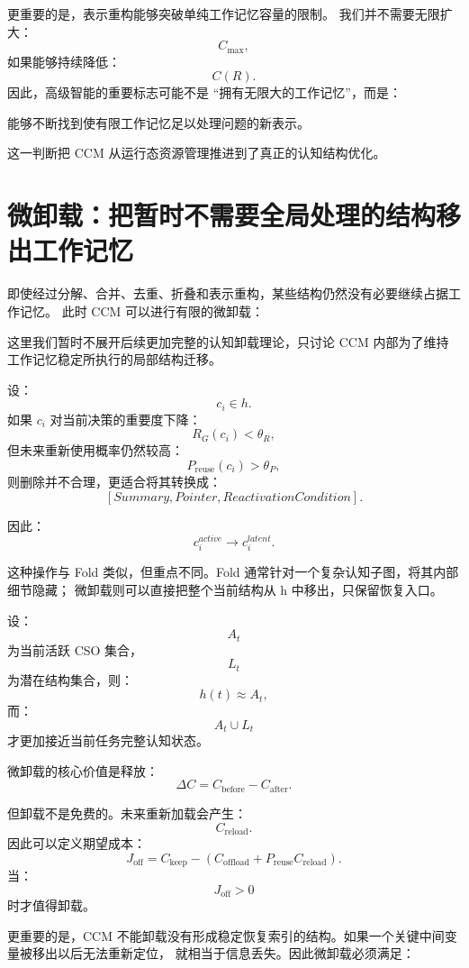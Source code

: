 更重要的是，表示重构能够突破单纯工作记忆容量的限制。
我们并不需要无限扩大：
\[
C_{\max},
\]
如果能够持续降低：
\[
C(R).
\]
因此，高级智能的重要标志可能不是 ``拥有无限大的工作记忆''，而是：
\begin{statementbox}
能够不断找到使有限工作记忆足以处理问题的新表示。
\end{statementbox}

这一判断把 CCM 从运行态资源管理推进到了真正的认知结构优化。


\section{微卸载：把暂时不需要全局处理的结构移出工作记忆}

即使经过分解、合并、去重、折叠和表示重构，某些结构仍然没有必要继续占据工作记忆。
此时 CCM 可以进行有限的微卸载：
\begin{statementbox}
\centering
{}
\end{statementbox}

这里我们暂时不展开后续更加完整的认知卸载理论，只讨论 CCM 内部为了维持工作记忆稳定所执行的局部结构迁移。

设：
\[
c_i\in h.
\]
如果 $c_i$ 对当前决策的重要度下降：
\[
R_G(c_i)<\theta_R,
\]
但未来重新使用概率仍然较高：
\[
P_{\mathrm{reuse}}(c_i)>\theta_P,
\]
则删除并不合理，更适合将其转换成：
\[
[
Summary,
Pointer,
ReactivationCondition
].
\]

因此：
\[
c_i^{active}
\longrightarrow
c_i^{latent}.
\]

这种操作与 Fold 类似，但重点不同。Fold 通常针对一个复杂认知子图，将其内部细节隐藏；
微卸载则可以直接把整个当前结构从 h 中移出，只保留恢复入口。

设：
\[
A_t
\]
为当前活跃 CSO 集合，
\[
L_t
\]
为潜在结构集合，则：
\[
h(t)\approx A_t,
\]
而：
\[
A_t\cup L_t
\]
才更加接近当前任务完整认知状态。

微卸载的核心价值是释放：
\[
\Delta C
=
C_{\mathrm{before}}
-
C_{\mathrm{after}}.
\]

但卸载不是免费的。未来重新加载会产生：
\[
C_{\mathrm{reload}}.
\]
因此可以定义期望成本：
\[
J_{\mathrm{off}}
=
C_{\mathrm{keep}}
-
\left(
C_{\mathrm{offload}}
+
P_{\mathrm{reuse}}
C_{\mathrm{reload}}
\right).
\]
当：
\[
J_{\mathrm{off}}>0
\]
时才值得卸载。

更重要的是，CCM 不能卸载没有形成稳定恢复索引的结构。如果一个关键中间变量被移出以后无法重新定位，
就相当于信息丢失。因此微卸载必须满足：
\begin{statementbox}
\centering
{}
\end{statementbox}

